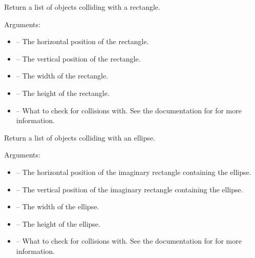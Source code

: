 \documentclass[letterpaper,10pt,english]{sphinxmanual}
\begin{document}
\begin{fulllineitems}
\label{collision:sge.collision.rectangle}
Return a list of objects colliding with a rectangle.

Arguments:
\begin{itemize}
\item {} 
 -- The horizontal position of the rectangle.

\item {} 
 -- The vertical position of the rectangle.

\item {} 
 -- The width of the rectangle.

\item {} 
 -- The height of the rectangle.

\item {} 
 -- What to check for collisions with.  See the
documentation for {\hyperref[dsp:sge.dsp.Object.collision]{\emph{}}} for more
information.

\end{itemize}

\end{fulllineitems}


\begin{fulllineitems}
\label{collision:sge.collision.ellipse}
Return a list of objects colliding with an ellipse.

Arguments:
\begin{itemize}
\item {} 
 -- The horizontal position of the imaginary rectangle
containing the ellipse.

\item {} 
 -- The vertical position of the imaginary rectangle
containing the ellipse.

\item {} 
 -- The width of the ellipse.

\item {} 
 -- The height of the ellipse.

\item {} 
 -- What to check for collisions with.  See the
documentation for {\hyperref[dsp:sge.dsp.Object.collision]{\emph{}}} for more
information.

\end{itemize}

\end{fulllineitems}
\end{document}
